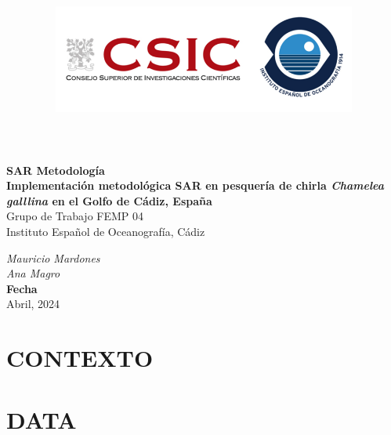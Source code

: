 \documentclass[
]{article}
\title{\includegraphics[width=10cm,height=\textheight]{IEO-logo2.png}}
\author{}
\date{\vspace{-2.5em}}
\begin{document}
\maketitle



\begin{flushleft}
\Large{\textbf{SAR Metodología}}\\
\vspace*{2\baselineskip}
\LARGE{\textbf{Implementación metodológica SAR en pesquería de chirla \textit{Chamelea galllina} en el Golfo de Cádiz, España}}\\
\vspace*{5\baselineskip}
\Large{Grupo de Trabajo FEMP 04}\\
\vspace*{1\baselineskip}
\Large{Instituto Español de Oceanografía, Cádiz }\\
\vspace*{4\baselineskip}
\end{flushleft}
\begin{flushright}
\large{\textit{Mauricio Mardones}}\\
\large{\textit{Ana Magro}}\\
\vspace*{1\baselineskip}
\normalsize{\textbf{Fecha}}\\
Abril, 2024
\end{flushright}



\hypersetup{linkcolor = black}
\newpage
{}

\newpage



\hypersetup{linkcolor = blue}

{
\hypersetup{linkcolor=}
\setcounter{tocdepth}{3}
\tableofcontents
}
\newpage

\hypertarget{contexto}{%
\section{CONTEXTO}\label{contexto}}

\hypertarget{data}{%
\section{DATA}\label{data}}
\end{document}
